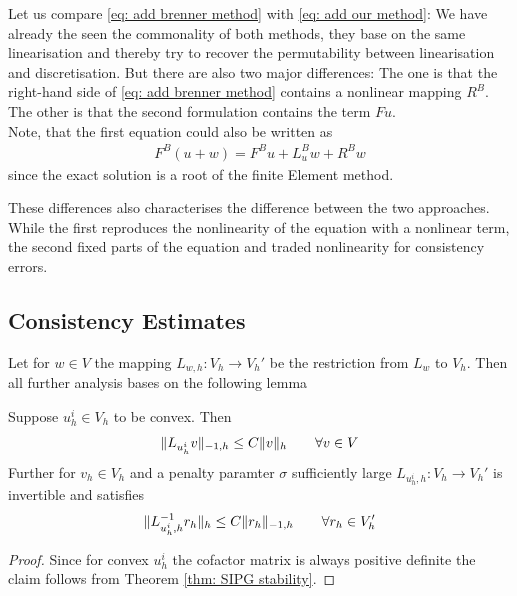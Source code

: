 Let us compare \eqref{eq: add brenner method} with \eqref{eq: add our method}: We have already the seen the commonality of both methods, they base on the same linearisation and thereby try to recover the permutability between linearisation and discretisation. 
But there are also two major differences: The one is that the right-hand side of \eqref{eq: add brenner method} contains a nonlinear mapping $R^B$. The other is that the second formulation contains the term $Fu$. \\
Note, that the first equation could also be written as 
 \begin{align*}
 F^B(u +w ) = F^B u + L^B_u w + R^Bw 
 \end{align*}
since the exact \MA solution is a root of the finite Element method. 

These differences also characterises the difference between the two approaches. 
While the first reproduces the nonlinearity of the \MA equation with a nonlinear term, the second fixed parts of the equation and traded nonlinearity for consistency errors.

\subsection{Consistency Estimates}

Let for $w \in V$ the mapping $L_{w,h}:V_h \rightarrow V_h'$ be the restriction from $L_w$ to $V_h$. Then all further analysis bases on the following lemma
\begin{lemma}[Stability] \label{la: stability L}
	Suppose $u_h^i \in V_h$ to be convex. Then 
	\begin{align}
		\lVert L_{u_h^i}v \rVert_{-1,h} \leq C \lVert v \rVert_{h} \qquad \forall v \in V
	\end{align}
	Further for $v_h \in V_h$ and a penalty paramter $\sigma $ sufficiently large $L_{u^i_h,h}: V_h \rightarrow V_h'$ is invertible and satisfies
	\begin{align}
		\lVert L_{u^i_h,h}^{-1} r_h \rVert_{h} \leq C \lVert r_h \rVert_{-1,h} \qquad \forall r_h \in V_h'
	\end{align}
\end{lemma}
\begin{proof}
	Since for convex $u_h^i$ the cofactor matrix is always positive definite the claim follows from Theorem \ref{thm: SIPG stability}.
\end{proof}




